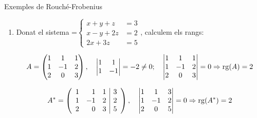 \documentclass[11pt,a4paper]{article}
\newcommand{\fmm}[1]{\setbox0=\hbox{$#1$}\ifdim\wd0>\linewidth\fmdisp{#1}\else\mbox{\box0}\fi}
\newcommand{\fmdisp}[1]{\[\setbox2=\hbox{$\displaystyle #1$}\ifdim\wd2>\linewidth\resizebox{\linewidth}{!}{\box2}\else\box2\fi\]}
\newcommand{\fmbadge}[2]{\tcbox[on line,colback=#1,colframe=#1,arc=2mm,boxsep=0pt,left=4pt,right=4pt,top=1.5pt,bottom=1.5pt]{\color{white}\footnotesize\bfseries #2}}
\begin{document}
\begin{fmex}{Exemples de Rouché-Frobenius}
\begin{enumerate}[label=\textbf{\arabic*.},leftmargin=*]
Com \fmm{\operatorname{rg}(A)=\operatorname{rg}(A^*)=2=} nre. d'incògnites, el sistema és \fmbadge{fmok}{SCD}. Per resoldre'l, eliminem la tercera equació (no forma part del menor que dona el rang) i apliquem Cramer:

\fmdisp{\left\{\begin{aligned}2x-y&=1\\ x+y&=2\end{aligned}\right.\Rightarrow x=\frac{\begin{vmatrix}1 & -1\\ 2 & 1\end{vmatrix}}{\begin{vmatrix}2 & -1\\ 1 & 1\end{vmatrix}}=\frac{3}{3}=1\qquad y=\frac{\begin{vmatrix}2 & 1\\ 1 & 2\end{vmatrix}}{\begin{vmatrix}2 & -1\\ 1 & 1\end{vmatrix}}=\frac{3}{3}=1\qquad\boxed{x=1;\ y=1}}

\item Donat el sistema \fmm{\left\{\begin{aligned}x+y+z&=3\\ x-y+2z&=2\\ 2x+3z&=5\end{aligned}\right.}, calculem els rangs:

\fmdisp{A=\begin{pmatrix}1 & 1 & 1\\ 1 & -1 & 2\\ 2 & 0 & 3\end{pmatrix},\quad\begin{vmatrix}1 & 1\\ 1 & -1\end{vmatrix}=-2\neq0;\quad\begin{vmatrix}1 & 1 & 1\\ 1 & -1 & 2\\ 2 & 0 & 3\end{vmatrix}=0\Rightarrow\operatorname{rg}(A)=2}

\fmdisp{A^*=\left(\begin{array}{rrr|r}1 & 1 & 1 & 3\\ 1 & -1 & 2 & 2\\ 2 & 0 & 3 & 5\end{array}\right),\quad\begin{vmatrix}1 & 1 & 3\\ 1 & -1 & 2\\ 2 & 0 & 5\end{vmatrix}=0\Rightarrow\operatorname{rg}(A^*)=2}


\end{enumerate}
\end{fmex}
\end{document}

